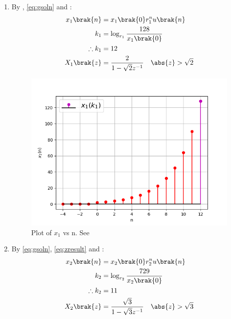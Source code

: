 \documentclass[journal,12pt,twocolumn]{IEEEtran}
\theoremstyle{remark}
\begin{document}
\begin{enumerate}[label=(\alph*)]
\item By , \eqref{eq:gsoln} and : %
\begin{align}
    x_1\brak{n} &= x_1\brak{0} r_1^nu\brak{n} \\
    k_1 &= \log_{r_1}{\frac{128}{x_1\brak{0}}} \\
    \therefore k_1 &= 12 \\
	X_1\brak{z} &= \frac{2}{1 - \sqrt{2}z^{-1}} \quad \abs{z} > \sqrt{2}
\end{align}

\begin{figure}[h!]
    \renewcommand\thefigure{1}
    \centering
    \includegraphics[width=\columnwidth]{ncert-maths/11/9/3/5/figs/a.png}
    \caption[short]{Plot of $x_1$ vs n. See }
    \label{fig:img1}
\end{figure}



\item By \eqref{eq:gsoln}, \eqref{eq:zresult} and : %
\begin{align}
    x_2\brak{n} &= x_2\brak{0} r_2^nu\brak{n} \\
    k_2 &= \log_{r_2}{\frac{729}{x_2\brak{0}}} \\
    \therefore k_2 &= 11 \\
    X_2\brak{z} &= \frac{\sqrt{3}}{1 - \sqrt{3}z^{-1}} \quad \abs{z} > \sqrt{3} 
\end{align}


\end{enumerate}
\end{document}
